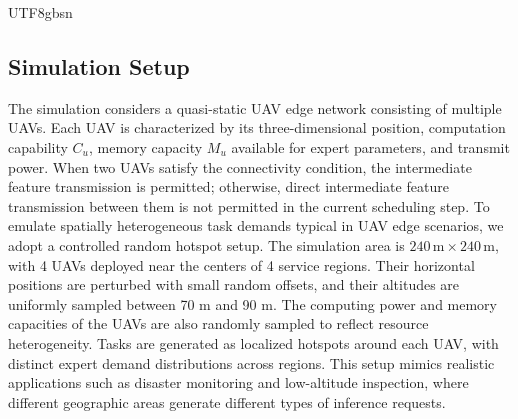 \documentclass[journal]{IEEEtran}
\begin{document}
\begin{CJK*}{UTF8}{gbsn}


\subsection{Simulation Setup}
\label{sec:setup}
The simulation considers a quasi-static UAV edge network consisting of multiple UAVs. Each UAV is characterized by its three-dimensional position, computation capability \(C_u\), memory capacity \(M_u\) available for expert parameters, and transmit power. %
When two UAVs satisfy the connectivity condition, the intermediate feature transmission is permitted; otherwise, direct intermediate feature transmission between them is not permitted in the current scheduling step.
To emulate spatially heterogeneous task demands typical in UAV edge scenarios, we adopt a controlled random hotspot setup. The simulation area is \(240\,\mathrm{m} \times 240\,\mathrm{m}\), with 4 UAVs deployed near the centers of 4 service regions. Their horizontal positions are perturbed with small random offsets, and their altitudes are uniformly sampled between 70 m and 90 m. The computing power and memory capacities of the UAVs are also randomly sampled to reflect resource heterogeneity. Tasks are generated as localized hotspots around each UAV, with distinct expert demand distributions across regions. This setup mimics realistic applications such as disaster monitoring and low-altitude inspection, where different geographic areas generate different types of inference requests.


\end{CJK*}
\end{document}
